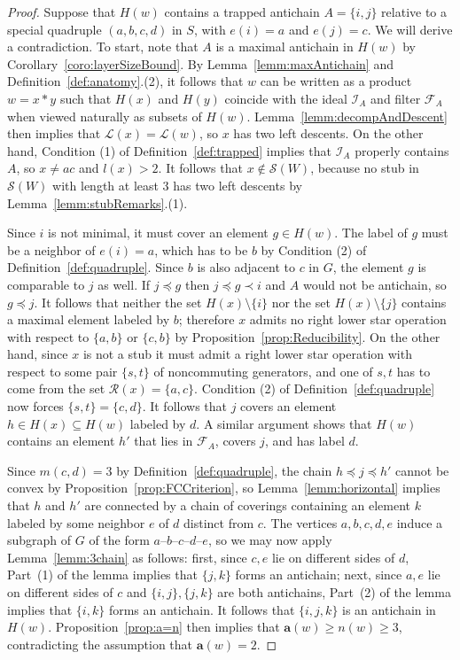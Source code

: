 \documentclass[ALCO,Unicode,published]{cedram}
\newcommand{\call}{\mathcal{L}}
\newcommand{\calr}{\mathcal{R}}
\newcommand{\la}{\mathbf{a}}
\newcommand{\sw}{\mathcal{S}(W)}
\newcommand{\se}{\subseteq}
\begin{document}
\begin{proof}
Suppose that $H(w)$ contains a trapped antichain $A=\{i,j\}$ relative to a special quadruple
$(a,b,c,d)$ in $S$, with $e(i)=a$ and $e(j)=c$. We will derive a contradiction.  To start, note that
$A$ is a maximal antichain in $H(w)$ by Corollary~\ref{coro:layerSizeBound}. By Lemma~\ref{lemm:maxAntichain} and
Definition~\ref{def:anatomy}.(2), it follows that $w$ can be written as a product $w=x*y$ such that $H(x)$ and
$H(y)$ coincide with the ideal $\mathcal{I}_A$ and filter $\mathcal{F}_A$ when viewed naturally as
subsets of $H(w)$.  Lemma~\ref{lemm:decompAndDescent} then implies that $\call(x)=\call(w)$, so $x$ has
two left descents. On the other hand, Condition (1) of Definition~\ref{def:trapped} implies that
$\mathcal{I}_A$ properly contains $A$, so $x\neq ac$ and $l(x)>2$.  It follows that $x\notin \sw$,
because no stub in $\sw$ with length at least 3 has two left descents by
Lemma~\ref{lemm:stubRemarks}.(1).

Since $i$ is not minimal, it must cover an element $g\in H(w)$. The label of $g$ must be a neighbor
of $e(i)=a$, which has to be $b$ by Condition (2) of Definition~\ref{def:quadruple}. Since $b$ is also
adjacent to $c$ in $G$, the element $g$ is comparable to $j$ as well. If $j\preceq g$ then $j\preceq
g\prec i$ and $A$ would not be antichain, so $g\preceq j$. It follows that neither the set
$H(x)\setminus\{i\}$ nor the set $H(x)\setminus\{j\}$ contains a maximal element labeled by $b$;
therefore $x$ admits no right lower star operation with respect to $\{a,b\}$ or $\{c,b\}$ by
Proposition~\ref{prop:Reducibility}. On the other hand, since $x$ is not a stub it must admit a right lower
star operation with respect to some pair $\{s,t\}$ of noncommuting generators, and one of $s,t$
has to come from the set $\calr(x)=\{a,c\}$.  Condition (2) of Definition~\ref{def:quadruple} now forces
$\{s,t\}=\{c,d\}$. It follows that $j$ covers an element $h\in H(x)\se H(w)$ labeled by $d$.  A
similar argument shows that $H(w)$ contains an element $h'$ that lies in $\mathcal{F}_A$, covers
$j$, and has label $d$. 


Since $m(c,d)=3$ by Definition~\ref{def:quadruple}, the chain $h\preceq j\preceq h'$ cannot be convex by
Proposition~\ref{prop:FCCriterion}, so Lemma~\ref{lemm:horizontal} implies that $h$ and $h'$ are connected by a
chain of coverings containing an element $k$ labeled by some neighbor $e$ of $d$ distinct from $c$.
The vertices $a,b,c,d,e$ induce a subgraph of $G$ of the form $a$--$b$--$c$--$d$--$e$, so we may now
apply Lemma~\ref{lemm:3chain} as follows: first, since $c,e$ lie on different sides of $d$, Part~(1) of
the lemma implies that $\{j,k\}$ forms an antichain; next, since $a,e$ lie on different sides of $c$
and $\{i,j\},\{j,k\}$ are both antichains, Part~(2) of the lemma implies that $\{i,k\}$ forms an
antichain.  It follows that $\{i,j,k\}$ is an antichain in $H(w)$. Proposition~\ref{prop:a=n} then implies that
$\la(w)\ge n(w)\ge 3$, contradicting the assumption that $\la(w)=2$.
\end{proof}
\end{document}
